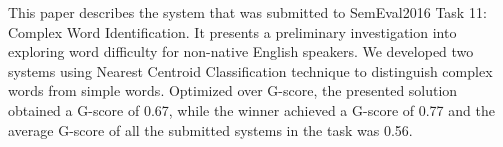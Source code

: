 This paper describes the system that was submitted to SemEval2016 Task 11: Complex Word Identification. It presents a preliminary investigation into exploring word difficulty for non-native English speakers. We developed two systems using Nearest Centroid Classification technique to distinguish complex words from simple words. Optimized over G-score, the presented solution obtained a G-score of 0.67, while the winner achieved a G-score of 0.77 and the average G-score of all the submitted systems in the task was 0.56.
